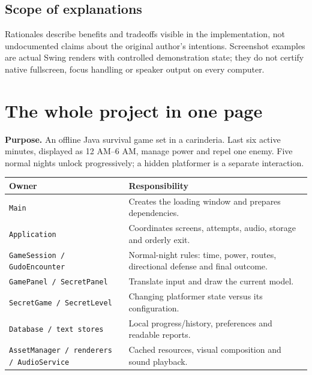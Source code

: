 \documentclass[11pt,a4paper]{article}
\newcommand{\code}[1]{\nolinkurl{#1}}
\begin{document}
\subsection*{Scope of explanations}
Rationales describe benefits and tradeoffs visible in the implementation, not undocumented claims about the original author's intentions. Screenshot examples are actual Swing renders with controlled demonstration state; they do not certify native fullscreen, focus handling or speaker output on every computer.

\clearpage{}\label{p:overview}\section*{The whole project in one page}

\textbf{Purpose.} An offline Java survival game set in a carinderia. Last six active minutes, displayed as 12 AM--6 AM, manage power and repel one enemy. Five normal nights unlock progressively; a hidden platformer is a separate interaction.
\par\noindent\begin{tabularx}{\linewidth}{L{.25\linewidth}X}\toprule\textbf{Owner}&\textbf{Responsibility}\\\midrule
\code{Main}&Creates the loading window and prepares dependencies.\\
\code{Application}&Coordinates screens, attempts, audio, storage and orderly exit.\\
\code{GameSession / GudoEncounter}&Normal-night rules: time, power, routes, directional defense and final outcome.\\
\code{GamePanel / SecretPanel}&Translate input and draw the current model.\\
\code{SecretGame / SecretLevel}&Changing platformer state versus its configuration.\\
\code{Database / text stores}&Local progress/history, preferences and readable reports.\\
\code{AssetManager / renderers / AudioService}&Cached resources, visual composition and sound playback.\\\bottomrule\end{tabularx}\par
\end{document}
